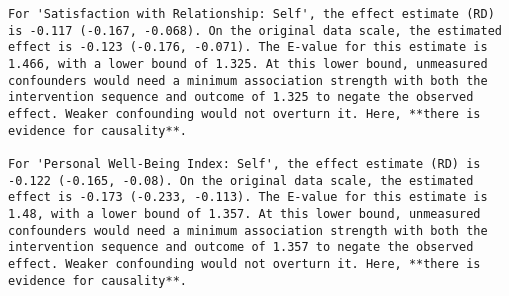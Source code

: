 \documentclass[
  singlecolumn]{article}
\begin{document}
\begin{verbatim}
For 'Satisfaction with Relationship: Self', the effect estimate (RD) is -0.117 (-0.167, -0.068). On the original data scale, the estimated effect is -0.123 (-0.176, -0.071). The E-value for this estimate is 1.466, with a lower bound of 1.325. At this lower bound, unmeasured confounders would need a minimum association strength with both the intervention sequence and outcome of 1.325 to negate the observed effect. Weaker confounding would not overturn it. Here, **there is evidence for causality**.

For 'Personal Well-Being Index: Self', the effect estimate (RD) is -0.122 (-0.165, -0.08). On the original data scale, the estimated effect is -0.173 (-0.233, -0.113). The E-value for this estimate is 1.48, with a lower bound of 1.357. At this lower bound, unmeasured confounders would need a minimum association strength with both the intervention sequence and outcome of 1.357 to negate the observed effect. Weaker confounding would not overturn it. Here, **there is evidence for causality**.
\end{verbatim}
\end{document}
